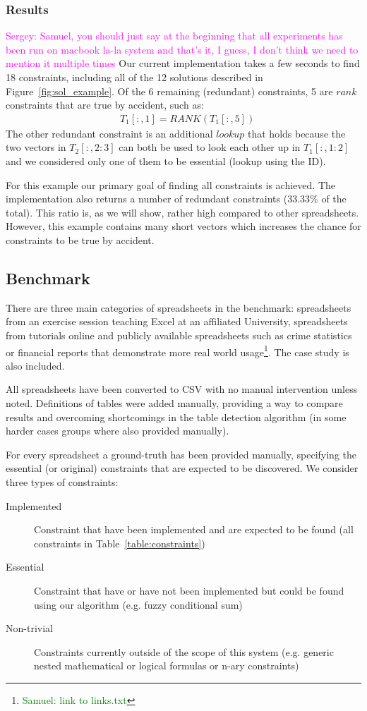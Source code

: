 \documentclass{ecai}
\newcommand{\sergey}[1]{\textcolor{magenta}{{\sc Sergey:} #1}\xspace}
\newcommand{\samuel}[1]{\textcolor{green}{{\sc Samuel:} #1}\xspace}
\newcommand{\range}[3]{\ensuremath{#1[#2,#3]}}
\newcommand{\rangeto}[2]{#1{:}#2}
\newcommand{\rangeall}{:}
\newcommand{\eccalc}[2]{\ensuremath{#1 = #2}}
\newcommand{\ecrank}[2]{\eccalc{#1}{\mathit{RANK}(#2)}}
\begin{document}
\subsubsection{Results}
\sergey{Samuel, you should just say at the beginning that all experiments has been run on macbook la-la system and that's it, I guess, I don't think we need to mention it multiple times}
Our current implementation takes a few seconds to find 18 constraints, including all of the 12 solutions described in Figure~\ref{fig:sol_example}.
Of the 6 remaining (redundant) constraints, 5 are $\mathit{rank}$ constraints that are true by accident, such as: \begin{align*}
  & \ecrank{\range{T_1}{\rangeall}{1}}{\range{T_1}{\rangeall}{5}}
\end{align*}
The other redundant constraint is an additional $\mathit{lookup}$ that holds because the two vectors in \range{T_2}{\rangeall}{\rangeto{2}{3}} can both be used to look each other up in \range{T_1}{\rangeall}{\rangeto{1}{2}} and we considered only one of them to be essential (lookup using the ID).

For this example our primary goal of finding all constraints is achieved.
The implementation also returns a number of redundant constraints ($33.33\%$ of the total).
This ratio is, as we will show, rather high compared to other spreadsheets.
However, this example contains many short vectors which increases the chance for constraints to be true by accident.

\subsection{Benchmark}
There are three main categories of spreadsheets in the benchmark: spreadsheets from an exercise session teaching Excel at an affiliated University, spreadsheets from tutorials online and publicly available spreadsheets such as crime statistics or financial reports that demonstrate more real world usage\footnote{\samuel{link to links.txt}}.
The case study is also included.

All spreadsheets have been converted to CSV with no manual intervention unless noted.
Definitions of tables were added manually, providing a way to compare results and overcoming shortcomings in the table detection algorithm (in some harder cases groups where also provided manually).

For every spreadsheet a ground-truth has been provided manually, specifying the essential (or original) constraints that are expected to be discovered.
We consider three types of constraints:
\begin{description}
  \item[Implemented] Constraint that have been implemented and are expected to be found (all constraints in Table~\ref{table:constraints})
  \item[Essential] Constraint that have or have not been implemented but could be found using our algorithm (e.g. fuzzy conditional sum)
  \item[Non-trivial] Constraints currently outside of the scope of this system (e.g. generic nested mathematical or logical formulas or n-ary constraints)
\end{description}
\end{document}
